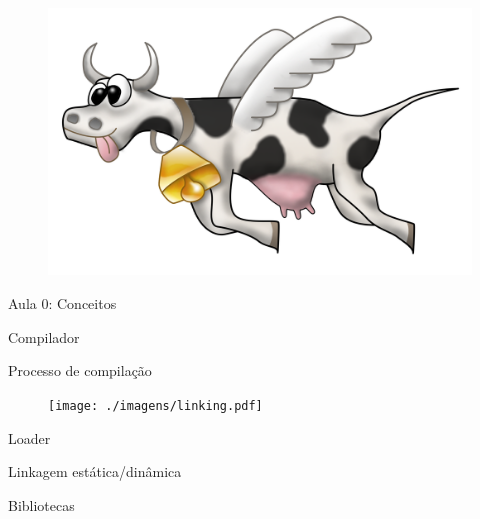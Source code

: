 \documentclass{beamer}
\begin{document}

\begin{frame}
    \begin{figure}[h]
        \centering
        \includegraphics[scale=0.094]{../imagens/Mooks_gpsl.png}
    \end{figure}
    \begin{center}
        \Huge Aula 0: Conceitos
    \end{center}
\end{frame}

\begin{frame}{Compilador}
    
\end{frame}

\begin{frame}{Processo de compilação}
    \begin{figure}[h]
        \centering
        \texttt{[image: ./imagens/linking.pdf]}
    \end{figure}
\end{frame}

\begin{frame}{Loader}
    
\end{frame}

\begin{frame}{Linkagem estática/dinâmica}
    
\end{frame}

\begin{frame}{Bibliotecas}
    
\end{frame}
\end{document}
